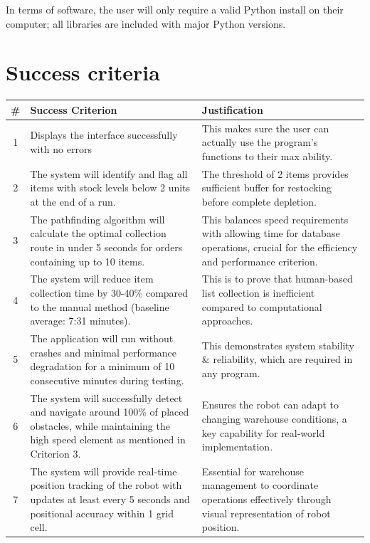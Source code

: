In terms of software, the user will only require a valid Python install on their computer; all libraries are included with major Python versions.

\newpage
\section{Success criteria}
\begin{table}[htbp!]
\centering
\begin{tabularx}{\textwidth}{|c|X|X|}
\hline
\textbf{\#} & \textbf{Success Criterion} & \textbf{Justification} \\
\hline
1 & Displays the interface successfully with no errors & This makes sure the user can actually use the program's functions to their max ability. \\
\hline
2 & The system will identify and flag all items with stock levels below 2 units at the end of a run. & The threshold of 2 items provides sufficient buffer for restocking before complete depletion. \\
\hline
3 & The pathfinding algorithm will calculate the optimal collection route in under 5 seconds for orders containing up to 10 items. & This balances speed requirements with allowing time for database operations, crucial for the efficiency and performance criterion. \\
\hline
4 & The system will reduce item collection time by 30-40\% compared to the manual method (baseline average: 7:31 minutes). & This is to prove that human-based list collection is inefficient compared to computational approaches. \\
\hline
5 & The application will run without crashes and minimal performance degradation for a minimum of 10 consecutive minutes during testing. & This demonstrates system stability \& reliability, which are required in any program. \\
\hline
6 & The system will successfully detect and navigate around 100\% of placed obstacles, while maintaining the high speed element as mentioned in Criterion 3. & Ensures the robot can adapt to changing warehouse conditions, a key capability for real-world implementation. \\
\hline
7 & The system will provide real-time position tracking of the robot with updates at least every 5 seconds and positional accuracy within 1 grid cell. & Essential for warehouse management to coordinate operations effectively through visual representation of robot position. \\

\end{tabularx}
\end{table}
